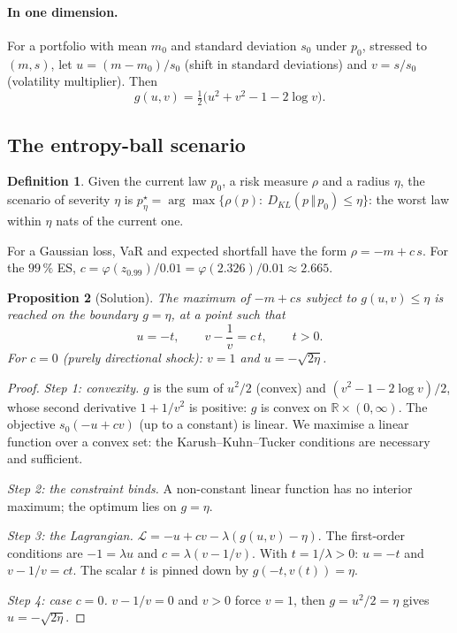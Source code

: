 \documentclass[11pt]{article}
\theoremstyle{plain}
\newtheorem{proposition}{Proposition}[section]
\theoremstyle{definition}
\newtheorem{definition}[proposition]{Definition}
\theoremstyle{remark}
\newcommand{\R}{\mathbb{R}}
\newcommand{\KL}[2]{D_{KL}\!\left(#1\,\Vert\,#2\right)}
\begin{document}
\paragraph{In one dimension.} For a portfolio with mean $m_0$ and standard
deviation $s_0$ under $p_0$, stressed to $(m,s)$, let $u=(m-m_0)/s_0$ (shift
in standard deviations) and $v=s/s_0$ (volatility multiplier). Then
\begin{equation}
\label{eq:g}
g(u,v)=\tfrac12\bigl(u^2+v^2-1-2\log v\bigr).
\end{equation}

\subsection{The entropy-ball scenario}

\begin{definition}
Given the current law $p_0$, a risk measure $\rho$ and a radius $\eta$, the
scenario of severity $\eta$ is
$p^\star_\eta=\arg\max\{\rho(p):\ \KL{p}{p_0}\le\eta\}$: the worst law within
$\eta$ nats of the current one.
\end{definition}

For a Gaussian loss, VaR and expected shortfall have the form $\rho=-m+c\,s$.
For the $99\,\%$ ES, $c=\varphi(z_{0.99})/0.01=\varphi(2.326)/0.01\approx2.665$.

\begin{proposition}[Solution]
\label{prop:boule}
The maximum of $-m+cs$ subject to $g(u,v)\le\eta$ is reached on the boundary
$g=\eta$, at a point such that
\[
u=-t,\qquad v-\frac1v=c\,t,\qquad t>0 .
\]
For $c=0$ (purely directional shock): $v=1$ and $u=-\sqrt{2\eta}$.
\end{proposition}

\begin{proof}
\emph{Step 1: convexity.} $g$ is the sum of $u^2/2$ (convex) and
$(v^2-1-2\log v)/2$, whose second derivative $1+1/v^2$ is positive: $g$ is
convex on $\R\times(0,\infty)$. The objective $s_0(-u+cv)$ (up to a constant)
is linear. We maximise a linear function over a convex set: the
Karush--Kuhn--Tucker conditions are necessary and sufficient.

\emph{Step 2: the constraint binds.} A non-constant linear function has no
interior maximum; the optimum lies on $g=\eta$.

\emph{Step 3: the Lagrangian.} $\mathcal L=-u+cv-\lambda(g(u,v)-\eta)$. The
first-order conditions are $-1=\lambda u$ and $c=\lambda(v-1/v)$. With
$t=1/\lambda>0$: $u=-t$ and $v-1/v=ct$. The scalar $t$ is pinned down by
$g(-t,v(t))=\eta$.

\emph{Step 4: case $c=0$.} $v-1/v=0$ and $v>0$ force $v=1$, then
$g=u^2/2=\eta$ gives $u=-\sqrt{2\eta}$.
\end{proof}
\end{document}
